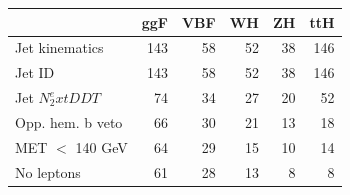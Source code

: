 \begin{tabular}{lrrrrr}
\toprule
 & ggF & VBF & WH & ZH & ttH \\
\midrule
Jet kinematics & 143 & 58 & 52 & 38 & 146 \\
Jet ID & 143 & 58 & 52 & 38 & 146 \\
Jet $N_2^	ext{DDT}$ & 74 & 34 & 27 & 20 & 52 \\
Opp. hem. b veto & 66 & 30 & 21 & 13 & 18 \\
MET $<$ 140 GeV & 64 & 29 & 15 & 10 & 14 \\
No leptons & 61 & 28 & 13 & 8 & 8 \\
\bottomrule
\end{tabular}
